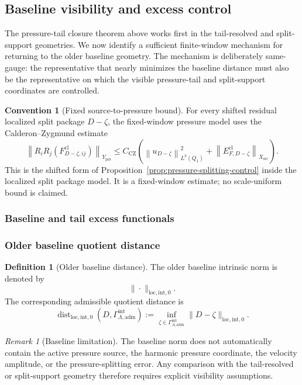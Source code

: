 \documentclass[11pt]{article}
\numberwithin{equation}{section}
\theoremstyle{definition}
\newtheorem{definition}[definition]{Definition}
\newtheorem{convention}[convention]{Convention}
\theoremstyle{remark}
\newtheorem{remark}[remark]{Remark}
\newcommand{\loc}{\mathrm{loc}}
\newcommand{\intg}{\mathrm{int}}
\newcommand{\adm}{\mathrm{adm}}
\newcommand{\prs}{\mathrm{prs}}
\newcommand{\src}{\mathrm{src}}
\newcommand{\cl}{\mathrm{cl}}
\newcommand{\CZ}{\mathrm{CZ}}
\newcommand{\norm}[2]{\left\|#1\right\|_{#2}}
\newcommand{\Dist}{\operatorname{dist}}
\newcommand{\Gammaadm}{\Gamma^{\intg}_{\Lambda,\adm}}
\begin{document}
\subsection{Baseline visibility and excess control}
\label{sec:baseline-visibility-excess}

The pressure-tail closure theorem above works first in the tail-resolved and
split-support geometries.  We now identify a sufficient finite-window mechanism
for returning to the older baseline geometry.  The mechanism is deliberately
same-gauge: the representative that nearly minimizes the baseline distance must
also be the representative on which the visible pressure-tail and split-support
coordinates are controlled.

\begin{convention}[Fixed source-to-pressure bound]
\label{conv:fixed-cz-bound}
For every shifted residual localized split package \(D-\zeta\), the fixed-window
pressure model uses the Calderon--Zygmund estimate
\[
    \norm{R_iR_j(F^{\cl}_{D-\zeta,ij})}{Y_{\prs}}
    \le
    C_{\CZ}
    \left(
        \norm{u_{D-\zeta}}{L^3(Q_1)}^2
        +
        \norm{E^{\cl}_{F,D-\zeta}}{X_{\src}}
    \right).
\]
This is the shifted form of Proposition~\ref{prop:pressure-splitting-control}
inside the localized split package model.  It is a fixed-window estimate; no
scale-uniform bound is claimed.
\end{convention}

\subsubsection{Baseline and tail excess functionals}
\label{sec:excess-functionals}

\subsubsection{Older baseline quotient distance}

\begin{definition}[Older baseline distance]
The older baseline intrinsic norm is denoted by
\[
    \|\cdot\|_{\loc,\intg,0}.
\]
The corresponding admissible quotient distance is
\[
    \Dist_{\loc,\intg,0}(D,\Gammaadm)
    :=
    \inf_{\zeta\in\Gammaadm}
    \|D-\zeta\|_{\loc,\intg,0}.
\]
\end{definition}

\begin{remark}[Baseline limitation]
The baseline norm does not automatically contain the active pressure source,
the harmonic pressure coordinate, the velocity amplitude, or the
pressure-splitting error.  Any comparison with the tail-resolved or
split-support geometry therefore requires explicit visibility assumptions.
\end{remark}
\end{document}
